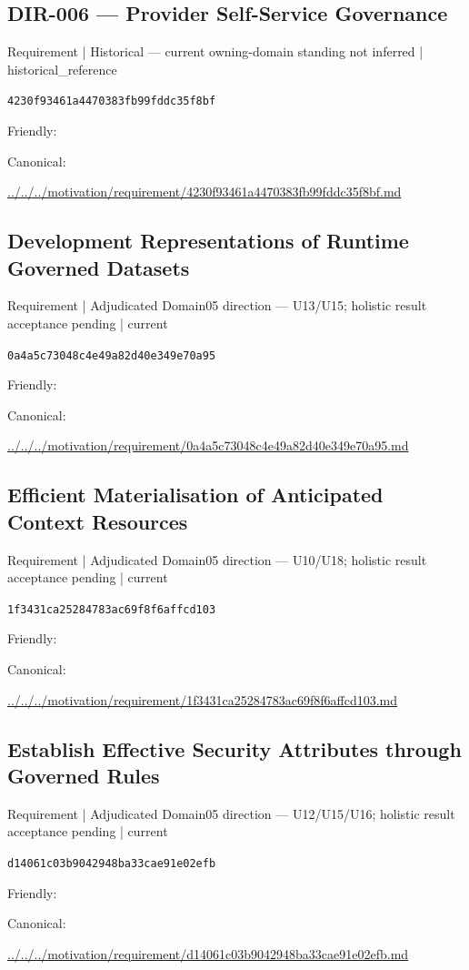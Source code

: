 \documentclass[10pt,a4paper]{article}
\begin{document}
\subsection*{DIR-006 — Provider Self-Service Governance}
{\small Requirement | Historical — current owning-domain standing not inferred | historical\_reference}\par
\texttt{4230f93461a4470383fb99fddc35f8bf}\par
Friendly: \par
Canonical: \par
{\footnotesize\url{../../../motivation/requirement/4230f93461a4470383fb99fddc35f8bf.md}}\par
\subsection*{Development Representations of Runtime Governed Datasets}
{\small Requirement | Adjudicated Domain05 direction — U13/U15; holistic result acceptance pending | current}\par
\texttt{0a4a5c73048c4e49a82d40e349e70a95}\par
Friendly: \par
Canonical: \par
{\footnotesize\url{../../../motivation/requirement/0a4a5c73048c4e49a82d40e349e70a95.md}}\par
\subsection*{Efficient Materialisation of Anticipated Context Resources}
{\small Requirement | Adjudicated Domain05 direction — U10/U18; holistic result acceptance pending | current}\par
\texttt{1f3431ca25284783ac69f8f6affcd103}\par
Friendly: \par
Canonical: \par
{\footnotesize\url{../../../motivation/requirement/1f3431ca25284783ac69f8f6affcd103.md}}\par
\subsection*{Establish Effective Security Attributes through Governed Rules}
{\small Requirement | Adjudicated Domain05 direction — U12/U15/U16; holistic result acceptance pending | current}\par
\texttt{d14061c03b9042948ba33cae91e02efb}\par
Friendly: \par
Canonical: \par
{\footnotesize\url{../../../motivation/requirement/d14061c03b9042948ba33cae91e02efb.md}}\par
\end{document}
